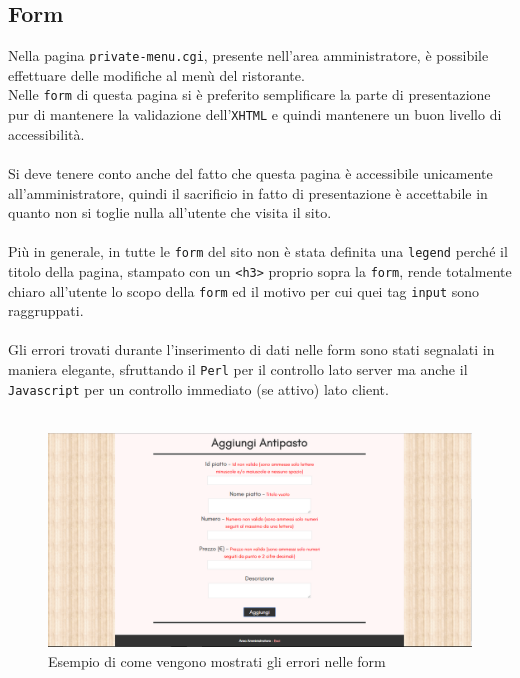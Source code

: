 \documentclass[../relazione.tex]{subfiles}
\begin{document}
	\subsection{Form}
		Nella pagina \texttt{private-menu.cgi}, presente nell'area amministratore, è possibile effettuare delle modifiche al menù del ristorante.\\
		Nelle \texttt{form} di questa pagina si è preferito semplificare la parte di presentazione pur di mantenere la validazione dell’\texttt{XHTML} e quindi mantenere un buon livello di accessibilità.\\\\
		Si deve tenere conto anche del fatto che questa pagina è accessibile unicamente all'amministratore, quindi il sacrificio in fatto di presentazione è accettabile in quanto non si toglie nulla all'utente che visita il sito.\\\\
		Più in generale, in tutte le \texttt{form} del sito non è stata definita una \texttt{legend} perché il titolo della pagina, stampato con un \texttt{<h3>} proprio sopra la \texttt{form}, rende totalmente chiaro all'utente lo scopo della \texttt{form} ed il motivo per cui quei tag \texttt{input} sono raggruppati.\\\\
		Gli errori trovati durante l'inserimento di dati nelle form sono stati segnalati in maniera elegante, sfruttando il \texttt{Perl} per il controllo lato server ma anche il \texttt{Javascript} per un controllo immediato (se attivo) lato client.\\\\
		\begin{figure}[H]
			\centering
			\includegraphics[width=\textwidth]{images/erroriForm}
			\caption{Esempio di come vengono mostrati gli errori nelle form}
			\label{fig:Esempio di come vengono mostrati gli errori nelle form}
		\end{figure}
	
\end{document}
